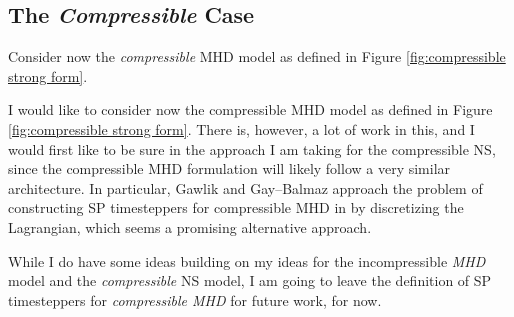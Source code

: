 \subsection*{The \emph{Compressible} Case}
    Consider now the \emph{compressible} MHD model as defined in Figure \ref{fig:compressible strong form}.

    \line

    \begin{remark}
        I would like to consider now the compressible MHD model as defined in Figure \ref{fig:compressible strong form}. There is, however, a lot of work in this, and I would first like to be sure in the approach I am taking for the compressible NS, since the compressible MHD formulation will likely follow a very similar architecture. In particular, Gawlik and Gay--Balmaz approach the problem of constructing SP timesteppers for compressible MHD in \cite{Gawlik_Gay--Balmaz_2021,Gawlik_Gay--Balmaz_2022} by discretizing the Lagrangian, which seems a promising alternative approach.
        
        While I do have some ideas building on my ideas for the incompressible \emph{MHD} model and the \emph{compressible} NS model, I am going to leave the definition of SP timesteppers for \emph{compressible MHD} for future work, for now.
    \end{remark}
